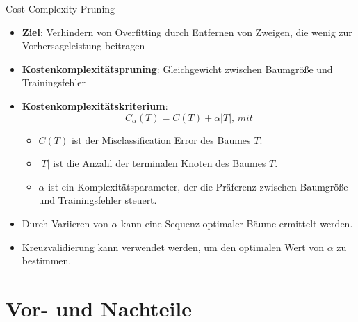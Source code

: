 \documentclass{beamer}
\begin{document}
\begin{frame}{Cost-Complexity Pruning}
	\begin{itemize}
		\item {\textbf{Ziel}: Verhindern von Overfitting durch Entfernen von Zweigen, die wenig zur Vorhersageleistung beitragen}
		\item {\textbf{Kostenkomplexitätspruning}: Gleichgewicht zwischen Baumgröße und Trainingsfehler}
		\item \textbf{Kostenkomplexitätskriterium}: \[C_{\alpha}(T) = C(T) + \alpha|T|, \, mit\]
		\begin{itemize}
			\item $C(T)$ ist der Misclassification Error des Baumes $T$.
			\item $|T|$ ist die Anzahl der terminalen Knoten des Baumes $T$.
			\item $\alpha$ ist ein Komplexitätsparameter, der die Präferenz zwischen Baumgröße und Trainingsfehler steuert.
		\end{itemize}
		\item Durch Variieren von $\alpha$ kann eine Sequenz optimaler Bäume ermittelt werden.
		\item Kreuzvalidierung kann verwendet werden, um den optimalen Wert von $\alpha$ zu bestimmen.
	\end{itemize}
\end{frame}






\section{Vor- und Nachteile}
\end{document}
